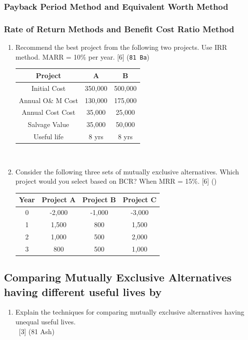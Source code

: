 \documentclass[12pt]{article}
\newcommand{\enter}{\\\textcolor{white}{1}}
\begin{document}
\subsubsection{Payback Period Method and Equivalent Worth Method}
\subsubsection{Rate of Return Methods and Benefit Cost Ratio Method}
\begin{enumerate}[noitemsep, topsep=0pt]
	\item Recommend the best project from the following two projects. Use IRR method. MARR = 10\% per year. \hfill [6] (\texttt{81 Ba})\\
	\begin{tabular}{|c|c|c|}
		\hline
		Project & A & B \\ \hline
		Initial Cost & 350,000 & 500,000 \\ \hline
		Annual O\& M Cost & 130,000 & 175,000 \\ \hline
		Annual Cost Cost & 35,000 & 25,000 \\ \hline
		Salvage Value & 35,000 & 50,000 \\ \hline
		Useful life & 8 yrs & 8 yrs \\ \hline
	\end{tabular}\\
	
	\item Consider the following three sets of mutually exclusive alternatives. Which project would you select based on BCR? When MRR = 15\%. \hfill [6] ()\\
	\begin{tabular}{|c|c|c|c|}
		\hline
		Year & Project A & Project B & Project C \\ \hline
		0 & -2,000 & -1,000 & -3,000 \\ \hline
		1 & 1,500 & 800 & 1,500 \\ \hline
		2 & 1,000 & 500 & 2,000 \\ \hline
		3 & 800 & 500 & 1,000 \\ \hline
	\end{tabular}
\end{enumerate}
\subsection{Comparing Mutually Exclusive Alternatives having different useful lives by}
\begin{enumerate}[noitemsep, topsep = 0pt]
	\item Explain the techniques for comparing mutually exclusive alternatives having unequal useful lives. 
	\enter\hfill [3] (81 Ash)
\end{enumerate}
\end{document}

